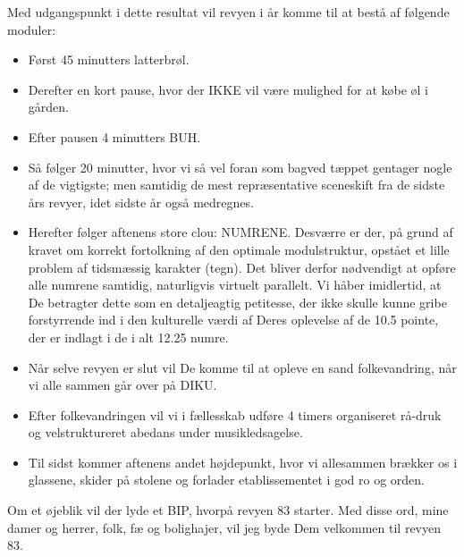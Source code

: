 \documentclass[a4paper,11pt]{article}
\begin{document}
\begin{sketch}
 Med udgangspunkt i dette resultat vil revyen i år komme til at bestå af følgende moduler:


\begin{itemize}
    \item Først 45 minutters latterbrøl.
    \item Derefter en kort pause, hvor der IKKE vil være mulighed for at købe øl i gården.
    \item Efter pausen 4 minutters BUH.
    \item Så følger 20 minutter, hvor vi så vel foran som bagved tæppet gentager nogle af de vigtigste; men samtidig de mest repræsentative sceneskift fra de sidste års revyer, idet sidste år også medregnes.
    \item Herefter følger aftenens store clou: NUMRENE. Desværre er der, på grund af kravet om korrekt fortolkning af den optimale modulstruktur, opstået et lille problem af tidsmæssig karakter (tegn). Det bliver derfor nødvendigt at opføre alle numrene samtidig, naturligvis virtuelt parallelt. Vi håber imidlertid, at De betragter dette som en detaljeagtig petitesse, der ikke skulle kunne gribe forstyrrende ind i den kulturelle værdi af Deres oplevelse af de 10.5 pointe, der er indlagt i de i alt 12.25 numre.
    \item Når selve revyen er slut vil De komme til at opleve en sand folkevandring, når vi alle sammen går over på DIKU.
    \item Efter folkevandringen vil vi i fællesskab udføre 4 timers organiseret rå-druk og velstruktureret abedans under musikledsagelse.
    \item Til sidst kommer aftenens andet højdepunkt, hvor vi allesammen brækker os i glassene, skider på stolene og forlader etablissementet i god ro og orden.
\end{itemize}

 Om et øjeblik vil der lyde et BIP, hvorpå revyen 83 starter. Med disse ord, mine damer og herrer, folk, fæ og bolighajer, vil jeg byde Dem velkommen til revyen 83.


\end{sketch}
\end{document}
